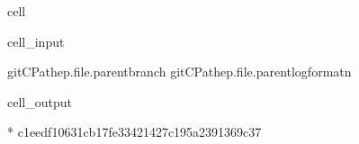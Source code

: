 \documentclass[letterpaper,table,10pt,english]{jupyterBook}
\begin{document}
\begin{sphinxuseclass}{cell}\begin{sphinxVerbatimInput}

\begin{sphinxuseclass}{cell_input}
\begin{sphinxVerbatim}[commandchars=\\\{\}]
git\PYGZhy{}CPathep.\PYGZus{}\PYGZus{}file\PYGZus{}\PYGZus{}.parentbranch
git\PYGZhy{}CPathep.\PYGZus{}\PYGZus{}file\PYGZus{}\PYGZus{}.parentlog\PYGZhy{}\PYGZhy{}format\PYGZhy{}n
\end{sphinxVerbatim}

\end{sphinxuseclass}\end{sphinxVerbatimInput}
\begin{sphinxVerbatimOutput}

\begin{sphinxuseclass}{cell_output}
\begin{sphinxVerbatim}[commandchars=\\\{\}]
* 
c1eedf10631cb17fe33421427c195a2391369c37
\end{sphinxVerbatim}

\end{sphinxuseclass}\end{sphinxVerbatimOutput}

\end{sphinxuseclass}
\end{document}

